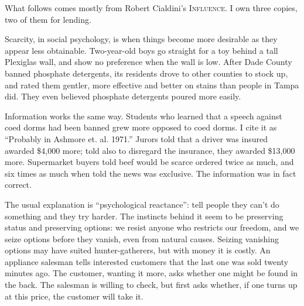 
What follows comes mostly from Robert Cialdini's \textsc{Influence}. I own three copies, two of them for lending.

Scarcity, in social psychology, is when things become more desirable as they appear less obtainable. Two-year-old boys go straight for a toy behind a tall Plexiglas wall, and show no preference when the wall is low.  After Dade County banned phosphate detergents, its residents drove to other counties to stock up, and rated them gentler, more effective and better on stains than people in Tampa did. They even believed phosphate detergents poured more easily.

Information works the same way. Students who learned that a speech against coed dorms had been banned grew more opposed to coed dorms. I cite it as ``Probably in Ashmore et. al. 1971.''  Jurors told that a driver was insured awarded \$4,000 more; told also to disregard the insurance, they awarded \$13,000 more.  Supermarket buyers told beef would be scarce ordered twice as much, and six times as much when told the news was exclusive.  The information was in fact correct. 

The usual explanation is ``psychological reactance'': tell people they can't do something and they try harder. The instincts behind it seem to be preserving status and preserving options: we resist anyone who restricts our freedom, and we seize options before they vanish, even from natural causes.  Seizing vanishing options may have suited hunter-gatherers, but with money it is costly. An appliance salesman tells interested customers that the last one was sold twenty minutes ago. The customer, wanting it more, asks whether one might be found in the back. The salesman is willing to check, but first asks whether, if one turns up at this price, the customer will take it.

